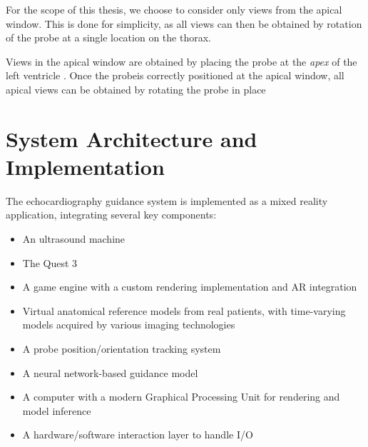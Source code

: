 \documentclass{article}
\begin{document}
For the scope of this thesis, we choose to consider only views from the apical window.
This is done for simplicity, as all views can then be obtained by rotation of the probe at a single location 
on the thorax.

Views in the apical window are obtained by placing the probe at the \textit{apex} of the left ventricle \cite{otto2018echocardiography}.
Once the probeis correctly positioned at the apical window, all apical views can be obtained by rotating the probe in place





\section{System Architecture and Implementation}
The echocardiography guidance system is implemented as a mixed reality application, integrating several key components:
\begin{itemize}
    \item An ultrasound machine
    \item The Quest 3
    \item A game engine with a custom rendering implementation and AR integration
    \item Virtual anatomical reference models from real patients, with time-varying models acquired by various imaging technologies
    \item A probe position/orientation tracking system
    \item A neural network-based guidance model
    \item A computer with a modern Graphical Processing Unit for rendering and model inference
    \item A hardware/software interaction layer to handle I/O
\end{itemize}
\end{document}
